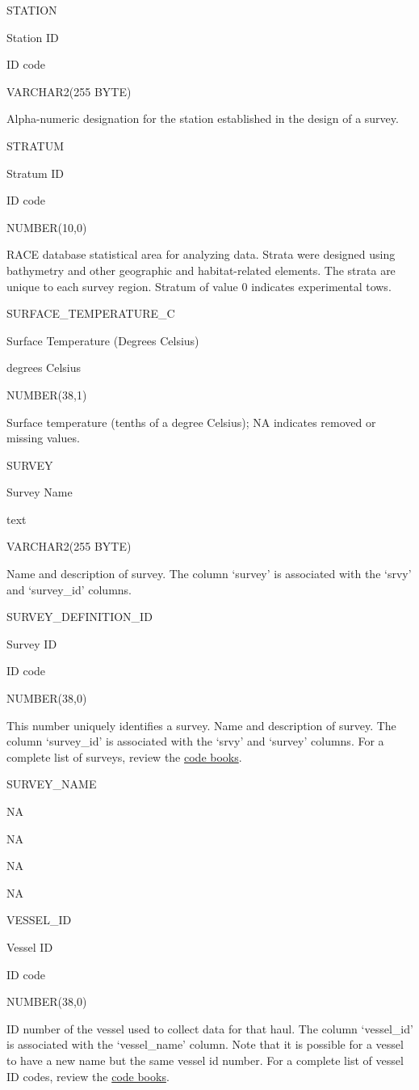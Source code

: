 \documentclass[
  letterpaper,
  oneside,
  open=any]{scrbook}
\begin{document}
STATION

Station ID

ID code

VARCHAR2(255 BYTE)

Alpha-numeric designation for the station established in the design of a
survey.

STRATUM

Stratum ID

ID code

NUMBER(10,0)

RACE database statistical area for analyzing data. Strata were designed
using bathymetry and other geographic and habitat-related elements. The
strata are unique to each survey region. Stratum of value 0 indicates
experimental tows.

SURFACE\_TEMPERATURE\_C

Surface Temperature (Degrees Celsius)

degrees Celsius

NUMBER(38,1)

Surface temperature (tenths of a degree Celsius); NA indicates removed
or missing values.

SURVEY

Survey Name

text

VARCHAR2(255 BYTE)

Name and description of survey. The column `survey' is associated with
the `srvy' and `survey\_id' columns.

SURVEY\_DEFINITION\_ID

Survey ID

ID code

NUMBER(38,0)

This number uniquely identifies a survey. Name and description of
survey. The column `survey\_id' is associated with the `srvy' and
`survey' columns. For a complete list of surveys, review the
\href{https://www.fisheries.noaa.gov/resource/document/groundfish-survey-species-code-manual-and-data-codes-manual}{code
books}.

SURVEY\_NAME

NA

NA

NA

NA

VESSEL\_ID

Vessel ID

ID code

NUMBER(38,0)

ID number of the vessel used to collect data for that haul. The column
`vessel\_id' is associated with the `vessel\_name' column. Note that it
is possible for a vessel to have a new name but the same vessel id
number. For a complete list of vessel ID codes, review the
\href{https://www.fisheries.noaa.gov/resource/document/groundfish-survey-species-code-manual-and-data-codes-manual}{code
books}.
\end{document}
